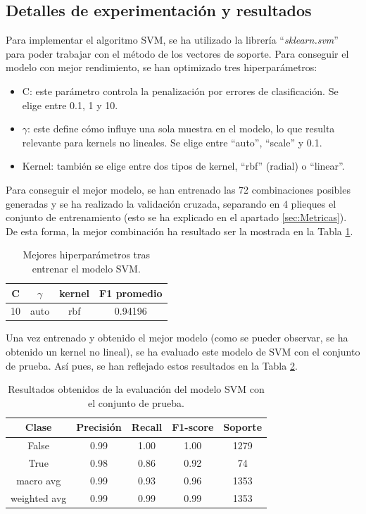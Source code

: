 \documentclass[12pt,letterpaper]{article}
\begin{document}
\subsection{ Detalles de experimentación y resultados}

Para implementar el algoritmo SVM, se ha utilizado la librería ``\textit{sklearn.svm}'' para poder trabajar con el método de los vectores de soporte. Para conseguir el modelo con mejor rendimiento, se han optimizado tres hiperparámetros: 

\begin{itemize}
    \item C: este parámetro controla la penalización por errores de clasificación. Se elige entre 0.1, 1 y 10.
    \item $\gamma$: este define cómo influye una sola muestra en el modelo, lo que resulta relevante para kernels no lineales. Se elige entre ``auto'', ``scale'' y 0.1.
    \item Kernel: también se elige entre dos tipos de kernel, ``rbf'' (radial) o ``linear''.
\end{itemize}

Para conseguir el mejor modelo, se han entrenado las 72 combinaciones posibles generadas y se ha realizado la validación cruzada, separando en 4 plieques el conjunto de entrenamiento (esto se ha explicado en el apartado \ref{sec:Metricas}). De esta forma, la mejor combinación ha resultado ser la mostrada en la Tabla \ref{tab:hiper-SVM}.
\begin{table}[htp]
    \centering
    \begin{tabular}{ccc|c}
     \hline
     \textbf{C} & $\gamma$ & \textbf{kernel} & F1 promedio \\ \hline
     10 & auto & rbf & 0.94196 \\ \hline
    \end{tabular}
    \caption{Mejores hiperparámetros tras entrenar el modelo SVM.}
    \label{tab:hiper-SVM}
\end{table}

Una vez entrenado y obtenido el mejor modelo (como se pueder observar, se ha obtenido un kernel no lineal), se ha evaluado este modelo de SVM con el conjunto de prueba. Así pues, se han reflejado estos resultados en la Tabla \ref{tab:res-SVM}.
\begin{table}[htp]
    \centering
    \begin{tabular}{ccccc}
    \hline
    \textbf{Clase} & \textbf{Precisión} & \textbf{Recall} & \textbf{F1-score} & \textbf{Soporte} \\ \hline
    False & 0.99 & 1.00 & 1.00 & 1279 \\ 
    True & 0.98 &  0.86 & 0.92 & 74 \\ 
    macro avg & 0.99 & 0.93 & 0.96 & 1353 \\ 
    weighted avg & 0.99 &  0.99 & 0.99 & 1353 \\ \hline
    \end{tabular}
    \caption{Resultados obtenidos de la evaluación del modelo SVM con el conjunto de prueba.}
    \label{tab:res-SVM}
\end{table}
\end{document}
